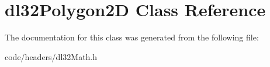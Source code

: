 \hypertarget{classdl32_polygon2_d}{\section{dl32\-Polygon2\-D Class Reference}
\label{classdl32_polygon2_d}
}


The documentation for this class was generated from the following file\-:\begin{DoxyCompactItemize}
\item 
code/headers/dl32\-Math.\-h\end{DoxyCompactItemize}

